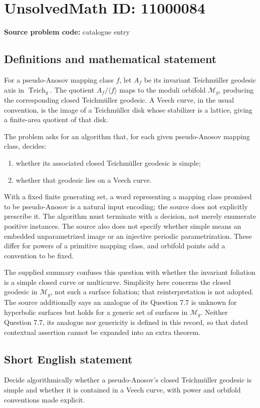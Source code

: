 \documentclass[11pt]{article}
\begin{document}
\section*{UnsolvedMath ID: 11000084}
\textbf{Source problem code:} catalogue entry
\subsection{Definitions and mathematical statement}
For a pseudo-Anosov mapping class \(f\), let \(A_f\) be its invariant Teichm\"uller geodesic axis in \(\operatorname{Teich}_g\). The quotient \(A_f/\langle f\rangle\) maps to the moduli orbifold \(\mathcal M_g\), producing the corresponding closed Teichm\"uller geodesic. A Veech curve, in the usual convention, is the image of a Teichm\"uller disk whose stabilizer is a lattice, giving a finite-area quotient of that disk.

The problem asks for an algorithm that, for each given pseudo-Anosov mapping class, decides:
\begin{enumerate}
\item whether its associated closed Teichm\"uller geodesic is simple;
\item whether that geodesic lies on a Veech curve.
\end{enumerate}
With a fixed finite generating set, a word representing a mapping class promised to be pseudo-Anosov is a natural input encoding; the source does not explicitly prescribe it. The algorithm must terminate with a decision, not merely enumerate positive instances. The source also does not specify whether simple means an embedded unparametrized image or an injective periodic parametrization. These differ for powers of a primitive mapping class, and orbifold points add a convention to be fixed.

The supplied summary confuses this question with whether the invariant foliation is a simple closed curve or multicurve. Simplicity here concerns the closed geodesic in \(\mathcal M_g\), not such a surface foliation; that reinterpretation is not adopted. The source additionally says an analogue of its Question 7.7 is unknown for hyperbolic surfaces but holds for a generic set of surfaces in \(\mathcal M_g\). Neither Question 7.7, its analogue nor genericity is defined in this record, so that dated contextual assertion cannot be expanded into an extra theorem.
\subsection{Short English statement}
Decide algorithmically whether a pseudo-Anosov's closed Teichm\"uller geodesic is simple and whether it is contained in a Veech curve, with power and orbifold conventions made explicit.
\end{document}
